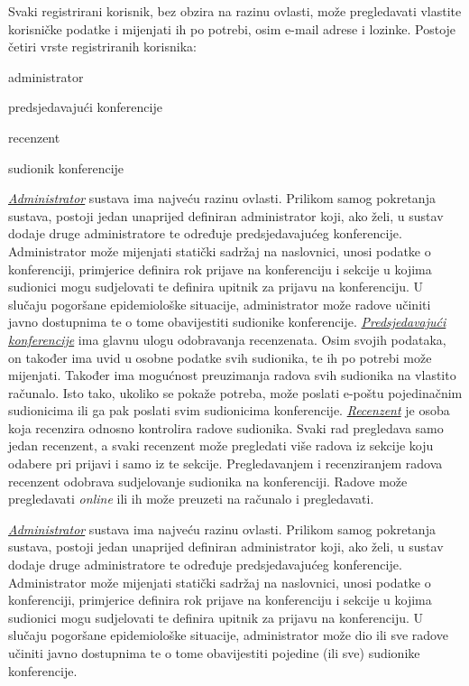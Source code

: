 		Svaki registrirani korisnik, bez obzira na razinu ovlasti, može pregledavati vlastite korisničke podatke i mijenjati ih po potrebi, osim e-mail adrese i lozinke. 
		\newline
		\newline
		Postoje četiri vrste registriranih korisnika:
		\begin{packed_item}
			
			\item administrator
			\item predsjedavajući konferencije
			\item recenzent
			\item sudionik konferencije
			
		\end{packed_item}
	

		\underline{\textit{Administrator}} sustava ima najveću razinu ovlasti. Prilikom samog pokretanja sustava, postoji jedan unaprijed definiran administrator koji, ako želi, u sustav dodaje druge administratore te određuje predsjedavajućeg konferencije. Administrator može mijenjati statički sadržaj na naslovnici, unosi podatke o konferenciji, primjerice definira rok prijave na konferenciju i sekcije u kojima sudionici mogu sudjelovati te definira upitnik za prijavu na konferenciju. U slučaju pogoršane epidemiološke situacije, administrator može radove učiniti javno dostupnima te o tome obavijestiti sudionike konferencije.
		\newline
		\newline
		\indent \underline{\textit{Predsjedavajući konferencije}} ima glavnu ulogu odobravanja recenzenata. Osim svojih podataka, on također ima uvid u osobne podatke svih sudionika, te ih po potrebi može mijenjati. Također ima mogućnost preuzimanja radova svih sudionika na vlastito računalo. Isto tako, ukoliko se pokaže potreba, može poslati e-poštu pojedinačnim sudionicima ili ga pak poslati svim sudionicima konferencije. 
		\newline
		\newline
		\indent \underline{\textit{Recenzent}} je osoba koja recenzira odnosno kontrolira radove sudionika. Svaki rad pregledava samo jedan recenzent, a svaki recenzent može pregledati više radova iz sekcije koju odabere pri prijavi i samo iz te sekcije. Pregledavanjem i recenziranjem radova recenzent odobrava sudjelovanje sudionika na konferenciji. Radove može pregledavati \textit{online} ili ih može preuzeti na računalo i pregledavati. 

		\underline{\textit{Administrator}} sustava ima najveću razinu ovlasti. Prilikom samog pokretanja sustava, postoji jedan unaprijed definiran administrator koji, ako želi, u sustav dodaje druge administratore te određuje predsjedavajućeg konferencije. Administrator može mijenjati statički sadržaj na naslovnici, unosi podatke o konferenciji, primjerice definira rok prijave na konferenciju i sekcije u kojima sudionici mogu sudjelovati te definira upitnik za prijavu na konferenciju. U slučaju pogoršane epidemiološke situacije, administrator može dio ili sve radove učiniti javno dostupnima te o tome obavijestiti pojedine (ili sve) sudionike konferencije.
		
